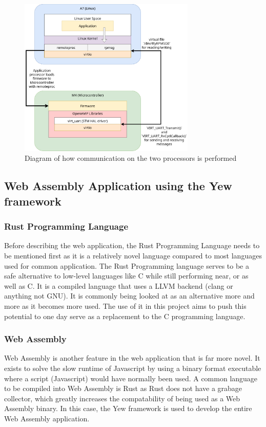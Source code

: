 \documentclass[12pt]{article}
\begin{document}
\begin{figure}[H]
  \centering
  \includegraphics[width=0.75\textwidth]{../assets/ipc.drawio.png}
  \caption{Diagram of how communication on the two processors is performed}
\end{figure}

\subsection{Web Assembly Application using the Yew framework}
\subsubsection{Rust Programming Language}
Before describing the web application, the Rust Programming Language needs to be
mentioned first as it is a relatively novel language compared to most languages
used for common application. The Rust Programming language serves to be a safe alternative to
low-level languages like C while still performing near, or as well as C. It is a compiled language that
uses a LLVM backend (clang or anything not GNU). It is commonly being looked at as an alternative more
and more as it becomes more used. The use of it in this project aims to push this potential to
one day serve as a replacement to the C programming language.

\subsubsection{Web Assembly}
Web Assembly is another feature in the web application that is far more novel. It exists to solve the slow
runtime of Javascript by using a binary format executable where a script (Javascript) would have normally been used.
A common language to be compiled into Web Assembly is Rust as Rust does not have a grabage collector, which greatly
increases the compatability of being used as a Web Assembly binary. In this case, the Yew framework is used to develop
the entire Web Assembly application.
\end{document}
